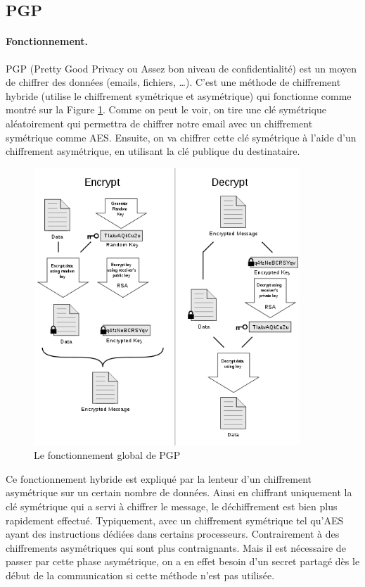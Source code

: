\subsection{PGP}

\paragraph*{Fonctionnement.}
PGP (Pretty Good Privacy ou Assez bon niveau de confidentialité) est un moyen de chiffrer des données (emails, fichiers, …). C’est une méthode de chiffrement hybride (utilise le chiffrement symétrique et asymétrique) qui fonctionne comme montré sur la Figure \ref{fig:PGP_101}. Comme on peut le voir, on tire une clé symétrique aléatoirement qui permettra de chiffrer notre email avec un chiffrement symétrique comme AES. Ensuite, on va chiffrer cette clé symétrique à l'aide d'un chiffrement asymétrique, en utilisant la clé publique du destinataire.

\begin{figure}[h!]
\includegraphics[width=10cm]{images/PGP_101.png}
\centering
\caption{Le fonctionnement global de PGP~\cite{pgpGlobal}}
\label{fig:PGP_101}
\end{figure}

Ce fonctionnement hybride est expliqué par la lenteur d’un chiffrement asymétrique sur un certain nombre de données. Ainsi en chiffrant uniquement la clé symétrique qui a servi à chiffrer le message, le déchiffrement est bien plus rapidement effectué. Typiquement, avec un chiffrement symétrique tel qu’AES ayant des instructions dédiées dans certains processeurs. Contrairement à des chiffrements asymétriques qui sont plus contraignants. Mais il est nécessaire de passer par cette phase asymétrique, on a en effet besoin d'un secret partagé dès le début de la communication si cette méthode n'est pas utilisée.

